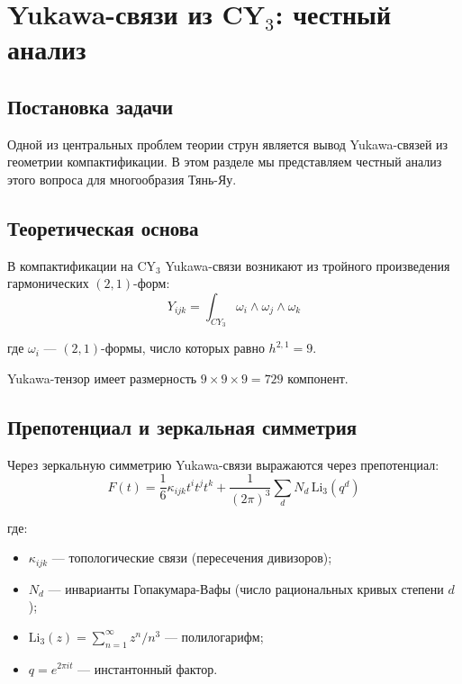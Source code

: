 \documentclass[12pt,a4paper,twoside]{article}
\theoremstyle{definition}
\begin{document}
\section{Yukawa-связи из \texorpdfstring{CY$_3$}{CY3}: честный анализ}
\label{sec:yukawa}

\subsection{Постановка задачи}

Одной из центральных проблем теории струн является вывод Yukawa-связей из геометрии компактификации. В этом разделе мы представляем честный анализ этого вопроса для многообразия Тянь-Яу.

\subsection{Теоретическая основа}

В компактификации на CY$_3$ Yukawa-связи возникают из тройного произведения гармонических $(2,1)$-форм:
\begin{equation}
Y_{ijk} = \int_{CY_3} \omega_i \wedge \omega_j \wedge \omega_k
\label{eq:yukawa_def}
\end{equation}

где $\omega_i$ — $(2,1)$-формы, число которых равно $h^{2,1} = 9$.

Yukawa-тензор имеет размерность $9 \times 9 \times 9 = 729$ компонент.

\subsection{Препотенциал и зеркальная симметрия}

Через зеркальную симметрию Yukawa-связи выражаются через препотенциал:
\begin{equation}
F(t) = \frac{1}{6} \kappa_{ijk} t^i t^j t^k + \frac{1}{(2\pi)^3} \sum_d N_d \, \text{Li}_3(q^d)
\label{eq:prepotential}
\end{equation}

где:
\begin{itemize}
    \item $\kappa_{ijk}$ — топологические связи (пересечения дивизоров);
    \item $N_d$ — инварианты Гопакумара-Вафы (число рациональных кривых степени $d$);
    \item $\text{Li}_3(z) = \sum_{n=1}^\infty z^n/n^3$ — полилогарифм;
    \item $q = e^{2\pi i t}$ — инстантонный фактор.
\end{itemize}
\end{document}
